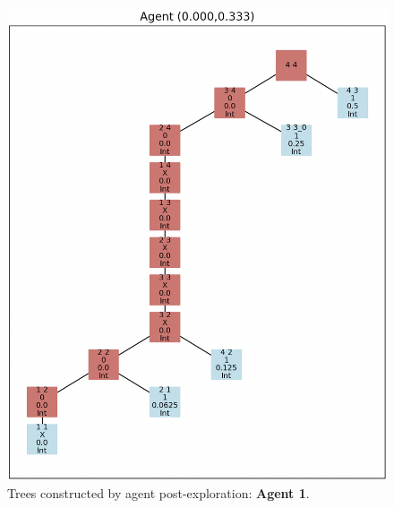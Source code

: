 \begin{figure}[H]
\centering
\includegraphics[width=1\textwidth]{Cap3/agent_1.png}
\caption{Trees constructed by agent post-exploration: \textbf{Agent 1}.}
\label{fig_agent_1_tree}
\end{figure}

